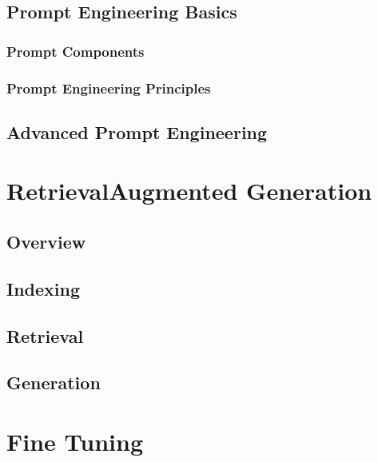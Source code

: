 \documentclass[letterpaper,11pt,english]{sphinxmanual}
\begin{document}
\section{Prompt Engineering Basics}
\label{\detokenize{prompt:prompt-engineering-basics}}

\subsection{Prompt Components}
\label{\detokenize{prompt:prompt-components}}

\subsection{Prompt Engineering Principles}
\label{\detokenize{prompt:prompt-engineering-principles}}

\section{Advanced Prompt Engineering}
\label{\detokenize{prompt:advanced-prompt-engineering}}
\sphinxstepscope


\chapter{Retrieval\sphinxhyphen{}Augmented Generation}
\label{\detokenize{rag:retrieval-augmented-generation}}\label{\detokenize{rag:rag}}\label{\detokenize{rag::doc}}

\section{Overview}
\label{\detokenize{rag:overview}}

\section{Indexing}
\label{\detokenize{rag:indexing}}

\section{Retrieval}
\label{\detokenize{rag:retrieval}}

\section{Generation}
\label{\detokenize{rag:generation}}
\sphinxstepscope


\chapter{Fine Tuning}
\label{\detokenize{finetuning:fine-tuning}}\label{\detokenize{finetuning:finetuning}}\label{\detokenize{finetuning::doc}}
\sphinxstepscope
\end{document}
